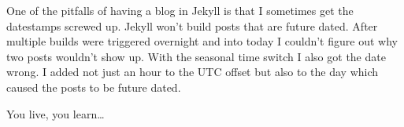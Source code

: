 One of the pitfalls of having a blog in Jekyll is that I sometimes get
the datestamps screwed up. Jekyll won't build posts that are future
dated. After multiple builds were triggered overnight and into today I
couldn't figure out why two posts wouldn't show up. With the seasonal
time switch I also got the date wrong. I added not just an hour to the
UTC offset but also to the day which caused the posts to be future
dated.

You live, you learn\ldots{}
